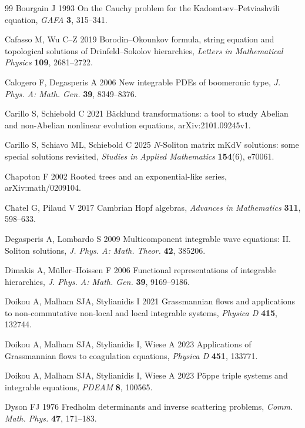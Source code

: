 \documentclass[5p,twocolumn]{elsarticle}
\begin{document}
\begin{thebibliography}{99}
 Bourgain J 1993 On the Cauchy problem for the Kadomtsev--Petviashvili equation, \textit{GAFA} \textbf{3}, 315--341.
  
 Cafasso M, Wu C--Z 2019 Borodin--Okounkov formula, string equation and topological solutions of Drinfeld--Sokolov hierarchies,
\textit{Letters in Mathematical Physics} \textbf{109}, 2681--2722.

 Calogero F, Degasperis A 2006 New integrable PDEs of boomeronic type, \textit{J. Phys. A: Math. Gen.} \textbf{39}, 8349--8376.
  
 Carillo S, Schiebold C 2021 B\"acklund transformations: a tool to study Abelian and non-Abelian nonlinear evolution equations,  arXiv:2101.09245v1.  

 Carillo S, Schiavo ML, Schiebold C 2025 $N$-Soliton matrix mKdV solutions: some special solutions revisited, \textit{Studies in Applied Mathematics} \textbf{154}(6), e70061.
  
 Chapoton F 2002 Rooted trees and an exponential-like series, arXiv:math/0209104.

 Chatel G, Pilaud V 2017 Cambrian Hopf algebras, \textit{Advances in Mathematics} \textbf{311}, 598--633.
  
 Degasperis A, Lombardo S 2009 Multicomponent integrable wave equations: II. Soliton solutions, \textit{J. Phys. A: Math. Theor.\/} \textbf{42}, 385206.
  
 Dimakis A, M\"uller--Hoissen F 2006 Functional representations of integrable hierarchies, \textit{J. Phys. A: Math. Gen.} \textbf{39}, 9169--9186.  
  
 Doikou A, Malham SJA, Stylianidis I 2021 Grassmannian flows and applications to non-commutative non-local and local integrable systems, \textit{Physica D} \textbf{415}, 132744.  

 Doikou A, Malham SJA, Stylianidis I, Wiese A 2023 Applications of Grassmannian flows to coagulation equations, \textit{Physica D} \textbf{451}, 133771.  

 Doikou A, Malham SJA, Stylianidis I, Wiese A 2023 P\"oppe triple systems and integrable equations, \textit{PDEAM} \textbf{8}, 100565.  

  
 Dyson FJ 1976 Fredholm determinants and inverse scattering problems, \textit{Comm. Math. Phys.} \textbf{47}, 171--183.


\end{thebibliography}
\end{document}
